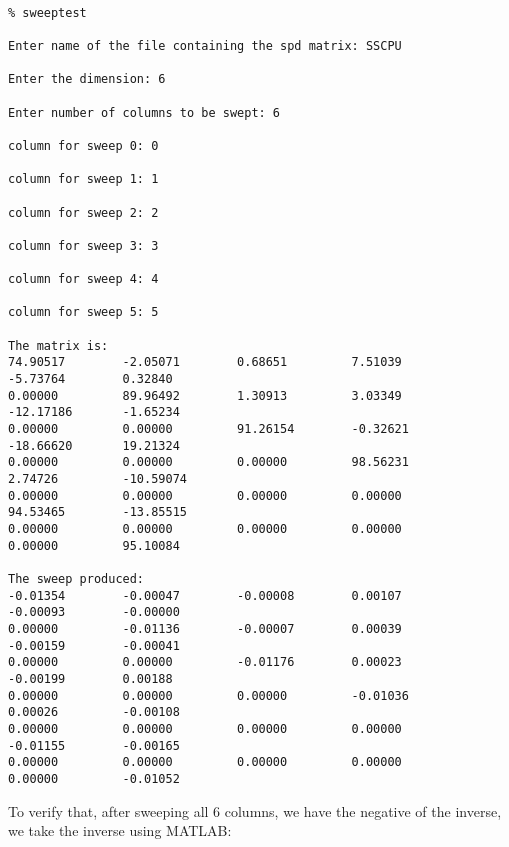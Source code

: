 \documentclass{article}
\begin{document}
{\tt
\begin{verbatim}
% sweeptest
 
Enter name of the file containing the spd matrix: SSCPU
 
Enter the dimension: 6
 
Enter number of columns to be swept: 6
 
column for sweep 0: 0
 
column for sweep 1: 1
 
column for sweep 2: 2
 
column for sweep 3: 3
 
column for sweep 4: 4
 
column for sweep 5: 5
 
The matrix is: 
74.90517        -2.05071        0.68651         7.51039         -5.73764        0.32840 
0.00000         89.96492        1.30913         3.03349         -12.17186       -1.65234 
0.00000         0.00000         91.26154        -0.32621        -18.66620       19.21324 
0.00000         0.00000         0.00000         98.56231        2.74726         -10.59074 
0.00000         0.00000         0.00000         0.00000         94.53465        -13.85515 
0.00000         0.00000         0.00000         0.00000         0.00000         95.10084 
 
The sweep produced: 
-0.01354        -0.00047        -0.00008        0.00107         -0.00093        -0.00000 
0.00000         -0.01136        -0.00007        0.00039         -0.00159        -0.00041 
0.00000         0.00000         -0.01176        0.00023         -0.00199        0.00188 
0.00000         0.00000         0.00000         -0.01036        0.00026         -0.00108 
0.00000         0.00000         0.00000         0.00000         -0.01155        -0.00165 
0.00000         0.00000         0.00000         0.00000         0.00000         -0.01052 
\end{verbatim}
}
To verify that, after sweeping all 6 columns, we have the negative of
the inverse, we take the inverse using MATLAB:
\\
\end{document}
